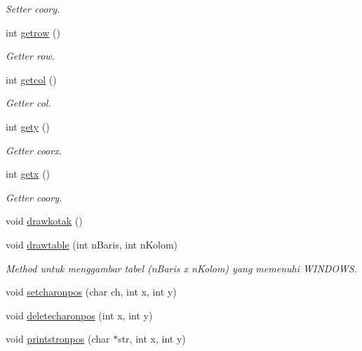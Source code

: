 \begin{DoxyCompactItemize}
\begin{DoxyCompactList}\small\item\em Setter coory. \end{DoxyCompactList}\item 
int \mbox{\hyperlink{classTampilan_a4adf565e9d2634938d9790fe8caca1b6}{getrow}} ()
\begin{DoxyCompactList}\small\item\em Getter row. \end{DoxyCompactList}\item 
int \mbox{\hyperlink{classTampilan_af1cad6ddd09a36776855f198e3ec069e}{getcol}} ()
\begin{DoxyCompactList}\small\item\em Getter col. \end{DoxyCompactList}\item 
int \mbox{\hyperlink{classTampilan_abc150afa98710a4b9f4599f3dd798269}{gety}} ()
\begin{DoxyCompactList}\small\item\em Getter coorx. \end{DoxyCompactList}\item 
int \mbox{\hyperlink{classTampilan_ab78540f8a9cb938def2b49628fd2968a}{getx}} ()
\begin{DoxyCompactList}\small\item\em Getter coory. \end{DoxyCompactList}\item 
void \mbox{\hyperlink{classTampilan_a88dc86562a58c797a63053e7736972e0}{drawkotak}} ()
\item 
void \mbox{\hyperlink{classTampilan_a0b00958444bbba962ff0bf9dbc6c98d3}{drawtable}} (int n\+Baris, int n\+Kolom)
\begin{DoxyCompactList}\small\item\em Method untuk menggambar tabel (n\+Baris x n\+Kolom) yang memenuhi W\+I\+N\+D\+O\+WS. \end{DoxyCompactList}\item 
void \mbox{\hyperlink{classTampilan_a39b78d35193b89db5e4d191b596b7734}{setcharonpos}} (char ch, int x, int y)
\item 
void \mbox{\hyperlink{classTampilan_ab14dbbd1c0207088deaefac8e0a48188}{deletecharonpos}} (int x, int y)
\item 
void \mbox{\hyperlink{classTampilan_aaab4834dd6d5d198abf824d8360d1270}{printstronpos}} (char $\ast$str, int x, int y)
\end{DoxyCompactItemize}


